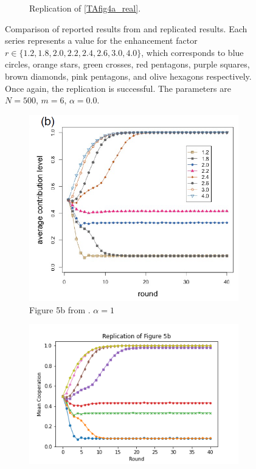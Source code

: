\begin{figure}[!h]
\begin{subfigure}[b]{0.45\textwidth}
    \caption{Replication of \ref{TAfig4a_real}. }
    \label{TAfig4a}
  \end{subfigure}
  \caption{Comparison of reported results from \cite{RN49} and replicated results. Each series represents a value for the enhancement factor $r \in \{1.2, 1.8, 2.0, 2.2, 2.4, 2.6, 3.0, 4.0\}$, which corresponds to blue circles, orange stars, green crosses, red pentagons, purple squares, brown diamonds, pink pentagons, and olive hexagons respectively. Once again, the replication is successful. The parameters are $N=500$, $m=6$, $\alpha = 0.0$. } \label{comp1}
\end{figure} 
\FloatBarrier




\FloatBarrier
\begin{figure}[!h] 
  \begin{subfigure}[b]{0.45\textwidth}
    \includegraphics[width=\textwidth]{images/TAfig4b_real.png}
    \caption{Figure 5b from \cite{RN49}. $\alpha = 1$ }
    \label{TAfig4b_real}
  \end{subfigure}
  \hfill
  \begin{subfigure}[b]{0.45\textwidth}
    \includegraphics[width=1.35\textwidth]{images/TAfig4b.png}

\end{subfigure}
\end{figure}
